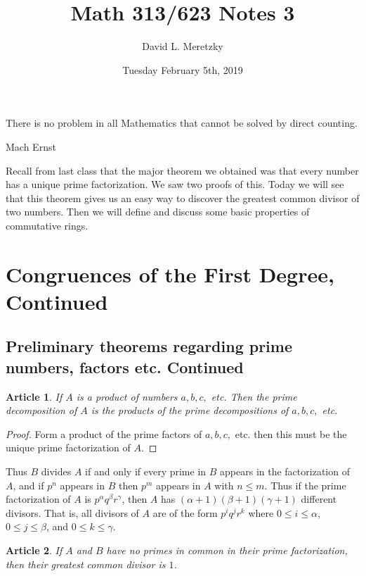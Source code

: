 \documentclass{article}
\title{ \vspace{-10ex} %
Math 313/623 Notes 3
}
\author{David L. Meretzky
}
\date{%
Tuesday February 5th, 2019
}
\theoremstyle{problemstyle}
\newtheorem{article}{Article}
\begin{document}
\maketitle

\epigraph{There is no problem in all Mathematics that cannot be solved by direct counting.}{Mach Ernst}

Recall from last class that the major theorem we obtained was that every number has a unique prime factorization. We saw two proofs of this. Today we will see that this theorem gives us an easy way to discover the greatest common divisor of two numbers. Then we will define and discuss some basic properties of commutative rings.  

\setcounter{section}{1}
\section{Congruences of the First Degree, Continued}

\setcounter{article}{16}

\subsection{Preliminary theorems regarding prime numbers, factors etc. Continued}

\begin{article}
If $A$ is a product of numbers $a,b,c,$ etc. Then the prime decomposition of $A$ is the products of the prime decompositions of $a,b,c,$ etc.
\end{article}

\begin{proof}
Form a product of the prime factors of $a,b,c,$ etc. then this must be the unique prime factorization of $A$. 
\end{proof}

Thus $B$ divides $A$ if and only if every prime in $B$ appears in the factorization of $A$, and if $p^n$ appears in $B$ then $p^m$ appears in $A$ with $n\leq m$. Thus if the prime factorization of $A$ is $p^\alpha q^\beta r^\gamma$, then $A$ has $(\alpha+1)(\beta+1)(\gamma + 1)$ different divisors. That is, all divisors of $A$ are of the form $p^i q^j r^k$ where $0 \leq i \leq \alpha$, $0 \leq j \leq \beta$, and $0 \leq k \leq \gamma$. 

\begin{article}
If $A$ and $B$ have no primes in common in their prime factorization, then their greatest common divisor is $1$. 
\end{article}
\end{document}
